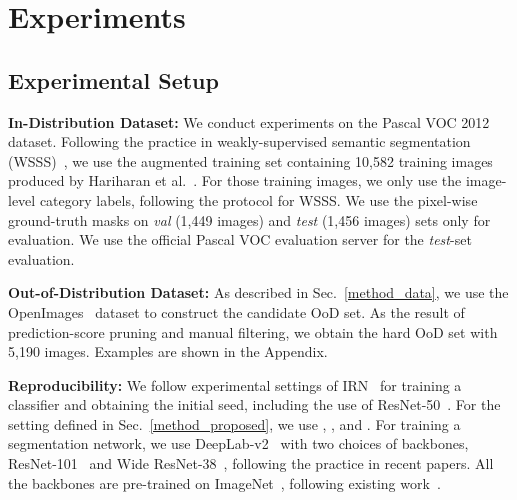 \documentclass[10pt,twocolumn,letterpaper]{article}
\begin{document}
\section{Experiments}
\subsection{Experimental Setup}\label{setup_sec}
\textbf{In-Distribution Dataset:} We conduct experiments on the Pascal VOC 2012~\cite{everingham2010pascal} dataset.
Following the practice in weakly-supervised semantic segmentation (WSSS)~\cite{lee2021anti, ahn2019weakly, wang2020self}, we use the augmented training set containing 10,582 training images produced by Hariharan et al.~\cite{hariharan2011semantic}.
For those training images, we only use the image-level category labels, following the protocol for WSSS.
We use the pixel-wise ground-truth masks on \textit{val} (1,449 images) and \textit{test} (1,456 images) sets only for evaluation.
We use the official Pascal VOC evaluation server for the \textit{test}-set evaluation.


\textbf{Out-of-Distribution Dataset:}
As described in Sec.~\ref{method_data}, we use the OpenImages~\cite{kuznetsova2020open} dataset to construct the candidate OoD set. As the result of prediction-score pruning and manual filtering, we obtain the hard OoD set  with 5,190 images.
Examples are shown in the Appendix.





\textbf{Reproducibility:}
We follow experimental settings of IRN~\cite{ahn2019weakly} for training a classifier and obtaining the initial seed, including the use of ResNet-50~\cite{he2016deep}. 
For the setting defined in Sec.~\ref{method_proposed}, we use , , and . 
For training a segmentation network, we use DeepLab-v2~\cite{chen2017deeplab} with two choices of backbones, ResNet-101~\cite{he2016deep} and Wide ResNet-38~\cite{wu2019wider}, following the practice in recent papers.
All the backbones are pre-trained on ImageNet~\cite{deng2009imagenet}, following existing work~\cite{ahn2018learning, wang2020self, zhang2020causal, kweon2021unlocking, li2021pseudo}.
\end{document}
